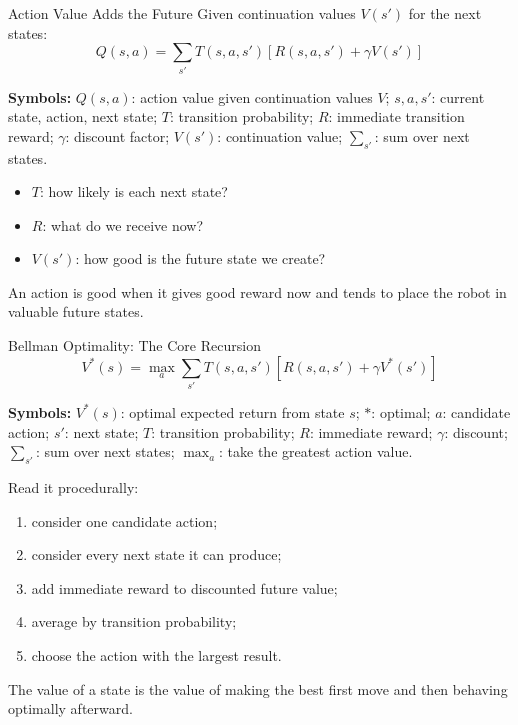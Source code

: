 \documentclass[aspectratio=169,10pt]{beamer}
\newcommand{\equationlegend}[1]{%
  \par\smallskip
  \begingroup
    \setlength{\fboxsep}{4pt}%
    \noindent\colorbox{DeckSoft}{%
      \parbox{\dimexpr\linewidth-2\fboxsep\relax}{%
        \footnotesize\textbf{Symbols:} #1%
      }%
    }\par
  \endgroup
  \smallskip
}
\begin{document}
\begin{frame}[shrink=10]{Action Value Adds the Future}
  Given continuation values $V(s')$ for the next states:
  \[
    Q(s,a)=\sum_{s'}T(s,a,s')\left[R(s,a,s')+\gamma V(s')\right]
  \]
  \equationlegend{$Q(s,a)$: action value given continuation values $V$; $s,a,s'$: current state, action, next state; $T$: transition probability; $R$: immediate transition reward; $\gamma$: discount factor; $V(s')$: continuation value; $\sum_{s'}$: sum over next states.}

  \begin{itemize}
    \item $T$: how likely is each next state?
    \item $R$: what do we receive now?
    \item $V(s')$: how good is the future state we create?
  \end{itemize}

  \begin{keyidea}
    An action is good when it gives good reward now and tends to place the robot in valuable future states.
  \end{keyidea}
\end{frame}

\begin{frame}[shrink=10]{Bellman Optimality: The Core Recursion}
  \[
    V^*(s)=\max_a\sum_{s'}T(s,a,s')
    \left[R(s,a,s')+\gamma V^*(s')\right]
  \]
  \equationlegend{$V^*(s)$: optimal expected return from state $s$; $*$: optimal; $a$: candidate action; $s'$: next state; $T$: transition probability; $R$: immediate reward; $\gamma$: discount; $\sum_{s'}$: sum over next states; $\max_a$: take the greatest action value.}

  Read it procedurally:
  \begin{enumerate}
    \item consider one candidate action;
    \item consider every next state it can produce;
    \item add immediate reward to discounted future value;
    \item average by transition probability;
    \item choose the action with the largest result.
  \end{enumerate}

  \begin{keyidea}
    The value of a state is the value of making the best first move and then behaving optimally afterward.
  \end{keyidea}
\end{frame}
\end{document}
